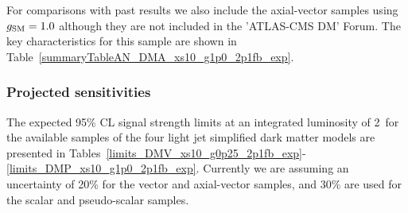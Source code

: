 \clearpage 

\clearpage
For comparisons with past results we also include the axial-vector samples using $g_{\rm SM} = 1.0$ although they are not included in the 
'ATLAS-CMS DM' Forum. The key characteristics for this sample are shown in Table~\ref{summaryTableAN_DMA_xs10_g1p0_2p1fb_exp}.




\subsubsection{Projected sensitivities}

The expected 95\% CL signal strength limits at an integrated luminosity of 2~\ifb for
the available samples of the four light jet simplified dark matter models are
presented in
Tables~\ref{limits_DMV_xs10_g0p25_2p1fb_exp}-\ref{limits_DMP_xs10_g1p0_2p1fb_exp}.
Currently we are assuming an uncertainty of 20\% for the vector and axial-vector samples, and 30\% are used 
for the scalar and pseudo-scalar samples.





\clearpage

%
% 
% 
% 

\clearpage

% 
\clearpage









